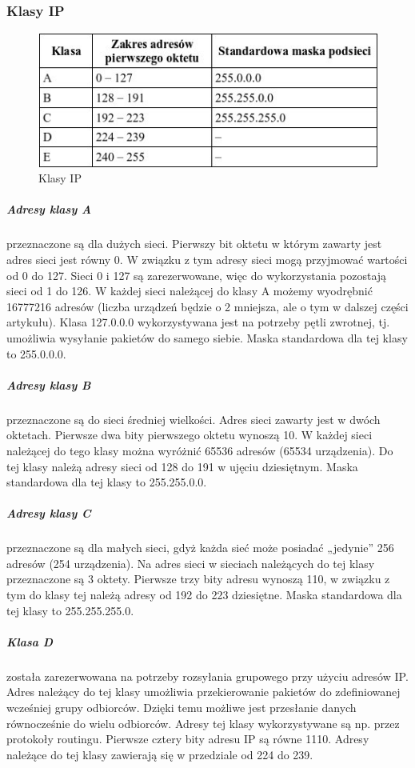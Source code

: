 \documentclass[a4paper,12pt,oneside]{book}
\begin{document}
			\subsubsection{Klasy IP}
				\begin{figure}[h!]
					\centering\includegraphics[scale=0.65]{ip-classes.jpg}
					\caption{Klasy IP}
				\end{figure}
			\subparagraph{Adresy klasy A} przeznaczone są dla dużych sieci. Pierwszy bit oktetu w którym zawarty jest adres sieci jest równy 0. W związku z tym adresy sieci mogą przyjmować wartości od 0 do 127. Sieci 0 i 127 są zarezerwowane, więc do wykorzystania pozostają sieci od 1 do 126. W każdej sieci należącej do klasy A możemy wyodrębnić 16777216 adresów (liczba urządzeń będzie o 2 mniejsza, ale o tym w dalszej części artykułu). Klasa 127.0.0.0 wykorzystywana jest na potrzeby pętli zwrotnej, tj. umożliwia wysyłanie pakietów do samego siebie. Maska standardowa dla tej klasy to 255.0.0.0.
			
			\subparagraph{Adresy klasy B} przeznaczone są do sieci średniej wielkości. Adres sieci zawarty jest w dwóch oktetach. Pierwsze dwa bity pierwszego oktetu wynoszą 10. W każdej sieci należącej do tego klasy można wyróżnić 65536 adresów (65534 urządzenia). Do tej klasy należą adresy sieci od 128 do 191 w ujęciu dziesiętnym. Maska standardowa dla tej klasy to 255.255.0.0.
			
			\subparagraph{Adresy klasy C} przeznaczone są dla małych sieci, gdyż każda sieć może posiadać „jedynie” 256 adresów (254 urządzenia). Na adres sieci w sieciach należących do tej klasy przeznaczone są 3 oktety. Pierwsze trzy bity adresu wynoszą 110, w związku z tym do klasy tej należą adresy od 192 do 223 dziesiętne. Maska standardowa dla tej klasy to 255.255.255.0.
			
			\subparagraph{Klasa D} została zarezerwowana na potrzeby rozsyłania grupowego przy użyciu adresów IP. Adres należący do tej klasy umożliwia przekierowanie pakietów do zdefiniowanej wcześniej grupy odbiorców. Dzięki temu możliwe jest przesłanie danych równocześnie do wielu odbiorców. Adresy tej klasy wykorzystywane są np. przez protokoły routingu. Pierwsze cztery bity adresu IP są równe 1110. Adresy należące do tej klasy zawierają się w przedziale od 224 do 239.
			
\end{document}
